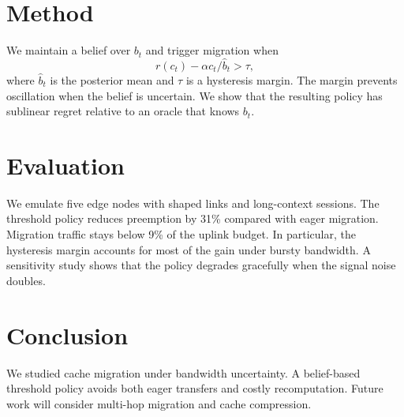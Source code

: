 \documentclass[conference]{IEEEtran}
\begin{document}
\section{Method}
\label{sec:method}
We maintain a belief over $b_t$ and trigger migration when
\begin{equation}
\label{eq:threshold}
r(c_t) - \alpha c_t / \hat{b}_t > \tau,
\end{equation}
where $\hat{b}_t$ is the posterior mean and $\tau$ is a hysteresis margin.
The margin prevents oscillation when the belief is uncertain.
We show that the resulting policy has sublinear regret relative to an oracle that knows $b_t$.

\section{Evaluation}
\label{sec:eval}
We emulate five edge nodes with shaped links and long-context sessions.
The threshold policy reduces preemption by 31\% compared with eager migration.
Migration traffic stays below 9\% of the uplink budget.
In particular, the hysteresis margin accounts for most of the gain under bursty bandwidth.
A sensitivity study shows that the policy degrades gracefully when the signal noise doubles.

\section{Conclusion}
\label{sec:conclusion}
We studied cache migration under bandwidth uncertainty.
A belief-based threshold policy avoids both eager transfers and costly recomputation.
Future work will consider multi-hop migration and cache compression.
\end{document}

